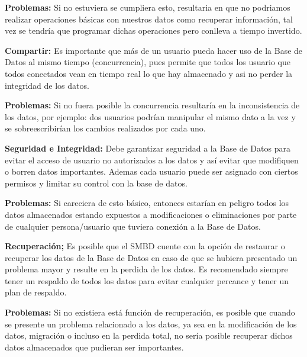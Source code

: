 \documentclass[12pt]{report}
\begin{document}
\begin{enumerate}[label=\textbf{\arabic*.}, leftmargin=*]
\begin{enumerate}[label=\textbf{\alph*.}, leftmargin=*, itemsep=1.0em]
\hspace{0.3cm}\textbf{Problemas:} 
Si no estuviera se cumpliera esto, resultaria en que no podriamos realizar operaciones básicas con nuestros datos como recuperar información, tal vez se tendría que programar dichas operaciones pero conlleva a tiempo invertido.

    
\textbf{Compartir:}
Es importante que más de un usuario pueda hacer uso de la Base de Datos al mismo tiempo (concurrencia), pues permite que todos los usuario que todos conectados vean en tiempo real lo que hay almacenado y asi no perder la integridad de los datos.

\hspace{0.3cm}\textbf{Problemas:} 
Si no fuera posible la concurrencia resultaría en la inconsistencia de los datos, por ejemplo: dos usuarios podrían manipular el mismo dato a la vez y se sobreescribirían los cambios realizados por cada uno. 
    
\textbf{Seguridad e Integridad:}
Debe garantizar seguridad a la Base de Datos para evitar el acceso de usuario no autorizados a los datos y así evitar que modifiquen o borren datos importantes. Ademas cada usuario puede ser asignado con ciertos permisos y limitar su control con la base de datos.
 
\hspace{0.3cm}\textbf{Problemas:} 
Si careciera de esto básico, entonces estarían en peligro todos los datos almacenados estando expuestos a modificaciones o eliminaciones por parte de cualquier persona/usuario que tuviera conexión a la Base de Datos.

\textbf{Recuperación;}
Es posible que el SMBD cuente con la opción de restaurar o recuperar los datos de la Base de Datos en caso de que se hubiera presentado un problema mayor y resulte en la perdida de los datos. Es recomendado siempre tener un respaldo de todos los datos para evitar cualquier percance y tener un plan de respaldo.

\hspace{0.3cm}\textbf{Problemas:}
Si no existiera está función de recuperación, es posible que cuando se presente un problema relacionado a los datos, ya sea en la modificación de los datos, migración o incluso en la perdida total, no sería posible recuperar dichos datos almacenados que pudieran ser importantes.



\end{enumerate}
\end{enumerate}
\end{document}
